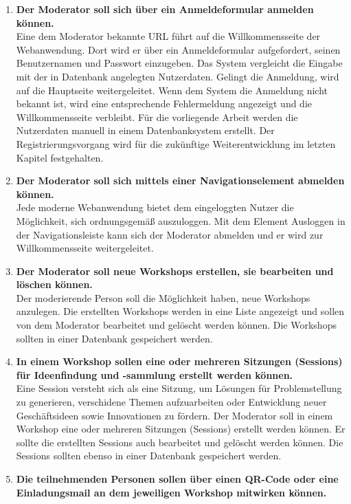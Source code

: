 \begin{enumerate}
\item \textbf{Der Moderator soll sich über ein Anmeldeformular anmelden können.}\\
Eine dem Moderator bekannte URL führt auf die Willkommensseite der Webanwendung. Dort wird er über ein Anmeldeformular aufgefordert, seinen Benutzernamen und Passwort einzugeben. Das System vergleicht die Eingabe mit der in Datenbank angelegten Nutzerdaten. Gelingt die Anmeldung, wird auf die Hauptseite weitergeleitet. Wenn dem System die Anmeldung nicht bekannt ist, wird eine entsprechende Fehlermeldung angezeigt und die Willkommensseite verbleibt. Für die vorliegende Arbeit werden die Nutzerdaten manuell in einem Datenbanksystem erstellt. Der Registrierungsvorgang wird für die zukünftige Weiterentwicklung im letzten Kapitel festgehalten. 
\item \textbf{Der Moderator soll sich mittels einer Navigationselement abmelden können.}\\ 
Jede moderne Webanwendung bietet dem eingeloggten Nutzer die Möglichkeit, sich ordnungsgemäß auszuloggen. Mit dem Element \glqq Ausloggen\grqq{} in der Navigationsleiste kann sich der Moderator abmelden und er wird zur Willkommensseite weitergeleitet.
\item \textbf{Der Moderator soll neue Workshops erstellen, sie bearbeiten und löschen können.}\\
Der moderierende Person soll die Möglichkeit haben, neue Workshops anzulegen. Die erstellten Workshops werden in eine Liste angezeigt und sollen von dem Moderator bearbeitet und gelöscht werden können. Die Workshops sollten in einer Datenbank gespeichert werden.
\item \textbf{In einem Workshop sollen eine oder mehreren Sitzungen (Sessions) für Ideenfindung und -sammlung erstellt werden können.}\\
Eine Session versteht sich als eine Sitzung, um Lösungen für Problemstellung zu generieren, verschidene Themen aufzuarbeiten oder Entwicklung neuer Geschäftsideen sowie Innovationen zu fördern. Der Moderator soll in einem Workshop eine oder mehreren Sitzungen (Sessions) erstellt werden können. Er sollte die erstellten Sessions auch bearbeitet und gelöscht werden können. Die Sessions sollten ebenso in einer Datenbank gespeichert werden.
\item \textbf{Die teilnehmenden Personen sollen über einen QR-Code oder eine Einladungsmail an dem jeweiligen Workshop mitwirken können.}\\

\end{enumerate}
